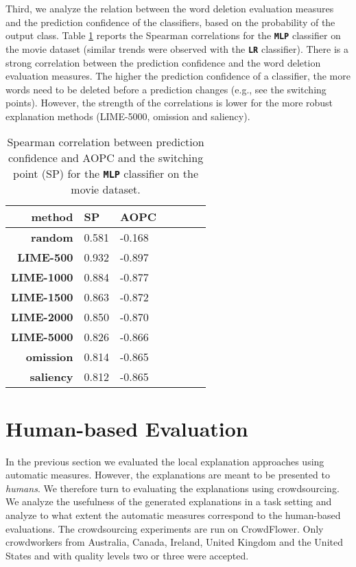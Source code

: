 \documentclass[11pt,a4paper]{article}
\begin{document}
Third, we analyze the relation between the word deletion evaluation measures and the prediction confidence  of the classifiers, based on the probability of the output class.
Table \ref{results_correlation_prediction_confidence} reports the Spearman correlations 
 for the \textbf{\texttt{MLP}} classifier on the movie dataset (similar trends were observed with the  \textbf{\texttt{LR}} classifier).
 There is a strong correlation between the prediction confidence and the word deletion evaluation measures. The higher the prediction confidence of a classifier, the more words need to be deleted before a prediction changes (e.g., see the switching points). However, the strength of the correlations is lower for the more robust explanation methods (LIME-5000, omission and saliency).

\begin{table}
\small
 \begin{tabular}{rllllll}
\toprule
\textbf{method}&  \textbf{SP}& \textbf{AOPC}\\
\midrule
\textbf{random}&0.581&-0.168\\
\textbf{LIME-500}&0.932&-0.897\\
\textbf{LIME-1000}&0.884&-0.877\\
\textbf{LIME-1500}&0.863&-0.872\\
\textbf{LIME-2000}&0.850&-0.870\\
\textbf{LIME-5000}&0.826&-0.866\\
\textbf{omission}&0.814&-0.865\\
\textbf{saliency}&0.812&-0.865\\
\bottomrule
\end{tabular}
\caption{Spearman correlation between prediction confidence and AOPC and the switching point (SP)  for the \textbf{\texttt{MLP}} classifier on the movie dataset. }
\label{results_correlation_prediction_confidence}
\end{table}
 

\section{Human-based Evaluation}
In the previous section we evaluated the local explanation approaches using automatic measures. However, the explanations are meant to be presented to \emph{humans}. We therefore turn to evaluating the explanations using crowdsourcing. We analyze the usefulness of the generated explanations in a task setting and analyze to what extent the automatic measures  correspond to the human-based evaluations.
The crowdsourcing experiments are run on  CrowdFlower. Only crowdworkers from Australia, Canada, Ireland, United Kingdom and the United States and with quality levels two or three were accepted.
\end{document}
